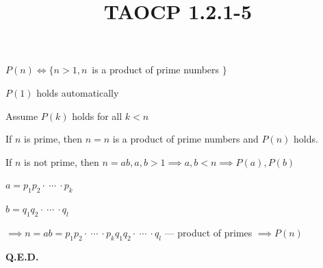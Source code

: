 \documentclass{article}
\title{TAOCP 1.2.1\mbox{-}5}
\begin{document}
\maketitle

\( P(n) \iff \{ n > 1, n\, \) is a product of prime numbers \( \} \)

\( P(1) \) holds automatically

Assume \( P(k) \) holds for all \( k < n \)

If \( n \) is prime, then \( n = n \) is a product of prime numbers and \( P(n) \) holds.

If \( n \) is not prime, then \( n = ab, a, b > 1 \implies a, b < n \implies P(a), P(b) \)

\( a = p_{1}p_{2} \cdot\ \cdots\ \cdot p_{k} \)

\( b = q_{1}q_{2} \cdot\ \cdots\ \cdot q_{l} \)

\( \implies n = ab = p_{1}p_{2} \cdot\ \cdots\ \cdot p_{k} q_{1}q_{2} \cdot\ \cdots\ \cdot q_{l} \) --- product of primes \( \implies P(n) \)

\textbf{Q.E.D.}
\end{document}
